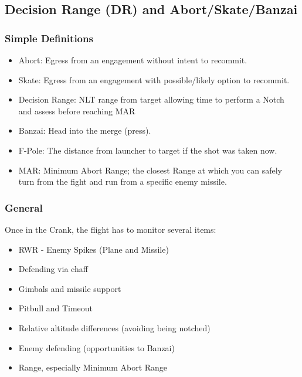 \subsection{Decision Range (DR) and Abort/Skate/Banzai}

\subsubsection*{Simple Definitions}

\begin{itemize}
  \item Abort: Egress from an engagement without intent to recommit.

  \item Skate: Egress from an engagement with possible/likely option to
    recommit.

  \item Decision Range: NLT range from target allowing time to perform a Notch
    and assess before reaching MAR

  \item Banzai: Head into the merge (press).

  \item F-Pole: The distance from launcher to target if the shot was taken now.

  \item MAR: Minimum Abort Range; the closest Range at which you can safely
    turn from the fight and run from a specific enemy missile.

\end{itemize}

\subsubsection*{General}

Once in the Crank, the flight has to monitor several items:

\begin{itemize}
  \item RWR - Enemy Spikes (Plane and Missile)
  \item Defending via chaff
  \item Gimbals and missile support
  \item Pitbull and Timeout
  \item Relative altitude differences (avoiding being notched)
  \item Enemy defending (opportunities to Banzai)
  \item Range, especially Minimum Abort Range
\end{itemize}

